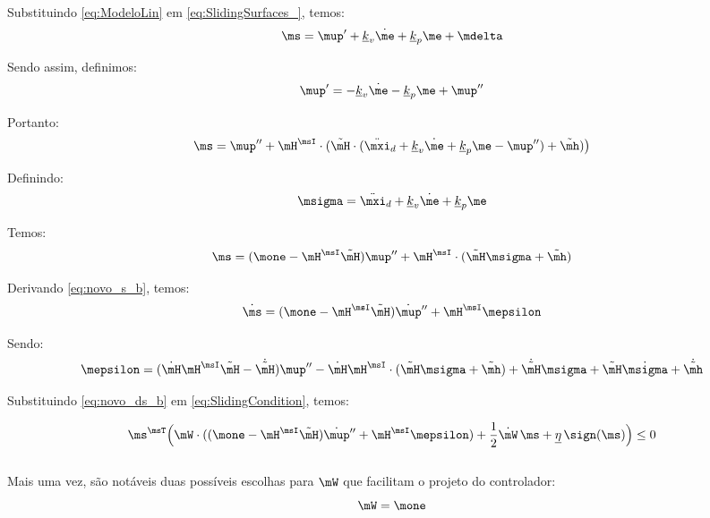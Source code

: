 \documentclass[]{politex}
\begin{document}
\begin{itemize}
Substituindo \eqref{eq:ModeloLin} em \eqref{eq:SlidingSurfaces_}, temos:
\begin{equation}
\ms = \mup' + \underline{k}_v \dot{\me} + \underline{k}_p \me + \mdelta
\end{equation}

Sendo assim, definimos:
\begin{equation}
\mup' = -\underline{k}_v \dot{\me} - \underline{k}_p \me + \mup''
\end{equation}

Portanto:
\begin{equation}
\ms = \mup'' + \mH^\msI \cdot ( \tilde{\mH} \cdot (\ddot{\mxi}_d + \underline{k}_v \dot{\me} + \underline{k}_p \me - \mup'') + \tilde{\mh} ) \big)
\end{equation}

Definindo:
\begin{equation}
\msigma = \ddot{\mxi}_d + \underline{k}_v \dot{\me} + \underline{k}_p \me
\end{equation}

Temos:
\begin{equation} \label{eq:novo_s_b}
\ms = (\mone - \mH^\msI \tilde{\mH} )\mup'' + \mH^\msI \cdot ( \tilde{\mH}\msigma + \tilde{\mh} )
\end{equation}

Derivando \eqref{eq:novo_s_b}, temos:
\begin{equation} \label{eq:novo_ds_b}
\dot{\ms} = (\mone - \mH^\msI \tilde{\mH} )\dot{\mup}'' + \mH^\msI \mepsilon
\end{equation}

Sendo:
\begin{equation}
\mepsilon = ( \dot{\mH} \mH^\msI \tilde{\mH} -\dot{\tilde{\mH}}) \mup'' -  \dot{\mH} \mH^\msI \cdot ( \tilde{\mH}\msigma + \tilde{\mh} ) +  \dot{\tilde{\mH}}\msigma + \tilde{\mH} \dot{\msigma} + \dot{\tilde{\mh}}
\end{equation}


Substituindo \eqref{eq:novo_ds_b} em \eqref{eq:SlidingCondition}, temos:

\begin{equation} \label{eq:SlidingCondition2b}
\ms^\msT \Big(\mW \cdot ( (\mone - \mH^\msI \tilde{\mH} )\dot{\mup}'' + \mH^\msI \mepsilon ) + \frac{1}{2}\dot{\mW} \, \ms + \underline{\eta} \, \sign(\ms) \Big) \leq 0
\end{equation} \\


Mais uma vez, são notáveis duas possíveis escolhas para $\mW$ que facilitam o projeto do controlador:
\begin{equation} \label{eq:W1b}
\mW = \mone
\end{equation}


\end{itemize}
\end{document}
